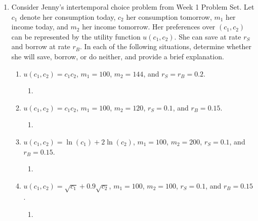 \documentclass[11pt]{article}
\begin{document}
\begin{enumerate}
\begin{enumerate}
\begin{enumerate}
        \end{enumerate}
    \end{enumerate}

\item Consider Jenny's intertemporal choice problem from Week 1 Problem Set. Let $c_{1}$ denote her consumption today, $c_{2}$ her consumption tomorrow, $m_{1}$ her income today, and $m_{2}$ her income tomorrow. Her preferences over $(c_{1},c_{2})$ can be represented by the utility function $u(c_{1},c_{2})$. She can save at rate $r_{S}$ and borrow at rate $r_{B}$. In each of the following situations, determine whether she will save, borrow, or do neither, and provide a brief explanation.

    \begin{enumerate}
        \item $u(c_{1},c_{2})=c_{1}c_{2}$, $m_{1}=100$, $m_{2}=144$, and $r_{S}=r_{B}=0.2$.
        \begin{enumerate}
            \item 
        \end{enumerate}

        \item $u(c_{1},c_{2})=c_{1}c_{2}$, $m_{1}=100$, $m_{2}=120$, $r_{S}=0.1$, and $r_{B}=0.15$.
        \begin{enumerate}
            \item 
        \end{enumerate}

        \item $u(c_{1},c_{2})=\ln(c_{1})+2\ln(c_{2})$, $m_{1}=100$, $m_{2}=200$, $r_{S}=0.1$, and $r_{B}=0.15$.
        \begin{enumerate}
            \item 
        \end{enumerate}

        \item $u(c_{1},c_{2})=\sqrt{c_{1}}+0.9\sqrt{c_{2}}$, $m_{1}=100$, $m_{2}=100$, $r_{S}=0.1$, and $r_{B}=0.15$.
        \begin{enumerate}
            \item 
        \end{enumerate}
    \end{enumerate}


\end{enumerate}
\end{document}
